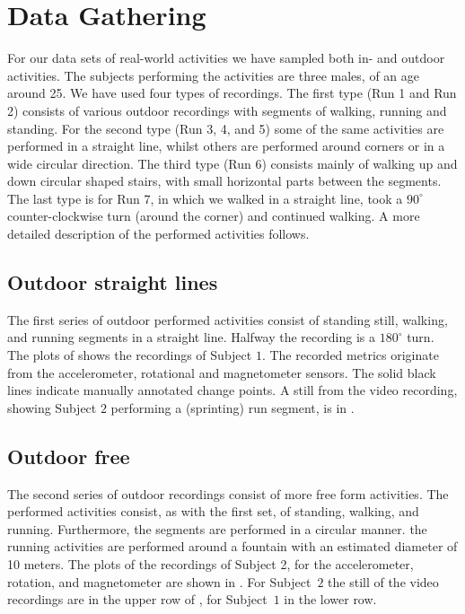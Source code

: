 \section{Data Gathering}\label{sec:data_gathering}
For our data sets of real-world activities we have sampled both in- and outdoor activities.
The subjects performing the activities are three males, of an age around 25.
We have used four types of recordings.
The first type (Run 1 and Run 2) consists of various outdoor recordings with segments of walking, running and standing.
For the second type (Run 3, 4, and 5) some of the same activities are performed in a straight line, whilst others are performed around corners or in a wide circular direction.
The third type (Run 6) consists mainly of walking up and down circular shaped stairs, with small horizontal parts between the segments.
The last type is for Run 7, in which we walked in a straight line, took a $90^{\circ}$ counter-clockwise turn (around the corner) and continued walking.
A more detailed description of the performed activities follows.

\subsection{Outdoor straight lines}\label{subsec:outdoor_straight}
The first series of outdoor performed activities consist of standing still, walking, and running segments in a straight line.
Halfway the recording is a $180^{\circ}$ turn.
The plots of  shows the recordings of Subject $1$.
The recorded metrics originate from the accelerometer, rotational and magnetometer sensors.
The solid black lines indicate manually annotated change points.
A still from the video recording, showing Subject $2$ performing a (sprinting) run segment, is in .

\subsection{Outdoor free}\label{subsec:outdoor_free}
The second series of outdoor recordings consist of more free form activities.
The performed activities consist, as with the first set, of standing, walking, and running.
Furthermore, the segments are performed in a circular manner.
\eg the running activities are performed around a fountain with an estimated diameter of 10 meters.
The plots of the recordings of Subject 2, for the accelerometer, rotation, and magnetometer are shown in .
For Subject~$2$ the still of the video recordings are in the upper row of , for Subject~$1$ in the lower row.

